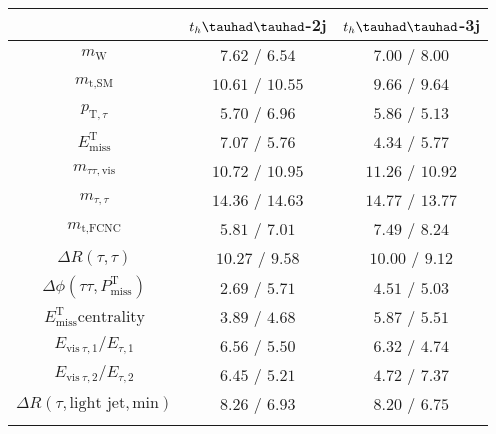 \centering
\begin{tabular}{ccc} \toprule\toprule
  & $t_h\thadhad$-2j & $t_h\thadhad$-3j\\\midrule
$m_{\text{W}}$                               & $7.62$ / $6.54$ & $7.00$ / $8.00$\\
$m_{\text{t},\text{SM}}$                            & $10.61$ / $10.55$ & $9.66$ / $9.64$\\
$p_{\text{T},\tau }$                         & $5.70$ / $6.96$ & $5.86$ / $5.13$\\
$E^{\text{T}}_{\text{miss}}$                        & $7.07$ / $5.76$ & $4.34$ / $5.77$\\
$m_{\tau\tau,\text{vis}}$                  & $10.72$ / $10.95$ & $11.26$ / $10.92$\\
$m_{\tau ,\tau }$                     & $14.36$ / $14.63$ & $14.77$ / $13.77$\\
$m_{\text{t},\text{FCNC}}$                          & $5.81$ / $7.01$ & $7.49$ / $8.24$\\
$\Delta R(\tau,\tau)$               & $10.27$ / $9.58$ & $10.00$ / $9.12$\\
$\Delta\phi(\tau\tau,P^{\text{T}}_{\text{miss}})$ & $2.69$ / $5.71$ & $4.51$ / $5.03$\\
$E^{\text{T}}_{\text{miss}} \text{centrality}$             & $3.89$ / $4.68$ & $5.87$ / $5.51$\\
$E_{\text{vis}~\tau ,1}/E_{\tau ,1}$         & $6.56$ / $5.50$ & $6.32$ / $4.74$\\
$E_{\text{vis}~\tau ,2}/E_{\tau ,2}$         & $6.45$ / $5.21$ & $4.72$ / $7.37$\\
$\Delta R(\tau,\text{light~jet},\text{min})$       & $8.26$ / $6.93$ & $8.20$ / $6.75$\\
\bottomrule\bottomrule\\
\end{tabular}
